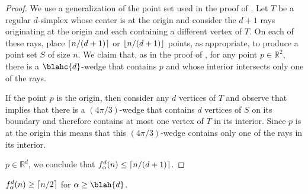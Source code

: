 \documentclass[lotsofwhite]{patmorin}
\begin{document}
\begin{proof} 
We use a generalization of the point set used in the proof of
.  Let $T$ be a regular $d$-simplex whose center is at the
origin and consider the $d+1$ rays originating at the origin and each
containing a different vertex of $T$.  On each of these rays, place
$\left\lceil n/(d+1) \right\rceil$ or $\left\lfloor n/(d+1) \right\rfloor$ points, as appropriate, to
produce a point set $S$ of size $n$.  We claim that, as in the proof
of , for any point $p\in\mathbb{R}^2$, there is a
$\blahc{d}$-wedge that contains $p$ and whose interior intersects only
one of the rays.

If the point $p$ is the origin, then consider any $d$ vertices of $T$
and observe that  implies that there is a
$(4\pi/3)$-wedge that contains $d$ vertices of $S$
on its boundary and therefore contains at most one vertex of $T$ in
its interior.  Since $p$ is at the origin this means that this
$(4\pi/3)$-wedge contains only one of the rays in its interior. 



$p\in\mathbb{R}^d$, we conclude that $f^d_\alpha(n)\le
\left\lceil n/(d+1) \right\rceil$.  
\end{proof}

\begin{lem}
 $f^d_\alpha(n) \ge \left\lceil n/2 \right\rceil$ for $\alpha \ge \blah{d}$.
\end{lem}
\end{document}
